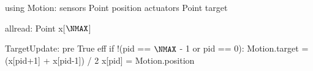 using Motion:
  sensors Point position
  actuators Point target

allread: Point x[$\NMAX$] $\label{lineform-allread}$

TargetUpdate:
  pre True
  eff if !(pid == $\NMAX$ - 1 or pid == 0):
     Motion.target = (x[pid+1] + x[pid-1]) / 2
     x[pid] = Motion.position